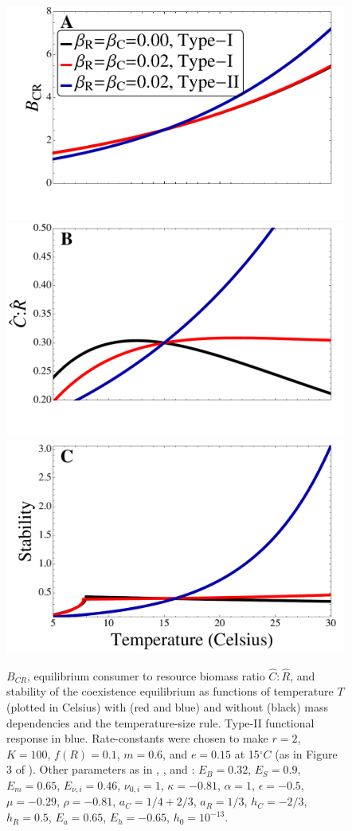 \documentclass[11pt]{article}
\begin{document}
\begin{figure}[!ht]
\centering
\includegraphics[width=0.5\linewidth]{BCRTypeII}\\\vspace{-0.75cm}
\includegraphics[width=0.5\linewidth]{CtoRTypeII}\\\vspace{-0.75cm}
\includegraphics[width=0.5\linewidth]{StabilityTypeII}
\caption{
$B_{CR}$, equilibrium consumer to resource biomass ratio $\hat{C}:\hat{R}$, and stability of the coexistence equilibrium as functions of temperature $T$ (plotted in Celsius) with (red and blue) and without (black) mass dependencies and the temperature-size rule.
Type-II functional response in blue.
Rate-constants were chosen to make $r = 2$, $K = 100$, $f(R) = 0.1$, $m = 0.6$, and $e = 0.15$ at 15$^\circ C$ (as in Figure 3 of \cite{Gilbert2014}).
Other parameters as in \cite{Gilbert2014}, \cite{DeLong2015}, and \cite{Rall2012}: $E_B = 0.32$, $E_S = 0.9$, $E_m = 0.65$, $E_{\nu,i} = 0.46$, $\nu_{0,i} = 1$, $\kappa = -0.81$, $\alpha = 1$, $\epsilon = -0.5$, $\mu = -0.29$, $\rho = -0.81$, $a_C = 1/4+2/3$, $a_R = 1/3$, $h_C = -2/3$, $h_R = 0.5$, $E_a = 0.65$, $E_h = -0.65$, $h_0 = 10^{-13}$.  
}
\label{TypeII}
\end{figure}
\end{document}
